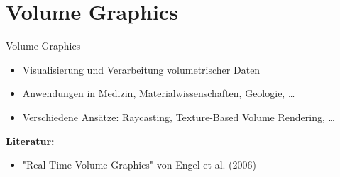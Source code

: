 \section{Volume Graphics}
\begin{frame}{Volume Graphics}
    \begin{itemize}
        \item Visualisierung und Verarbeitung volumetrischer Daten
        \item Anwendungen in Medizin, Materialwissenschaften, Geologie, \dots
        \item Verschiedene Ansätze: Raycasting, Texture-Based Volume Rendering, \dots
    \end{itemize}
    \vspace{1em}
    \textbf{Literatur:}
    \begin{itemize}
        \item "Real Time Volume Graphics" von Engel et al. (2006)
    \end{itemize}
\end{frame}